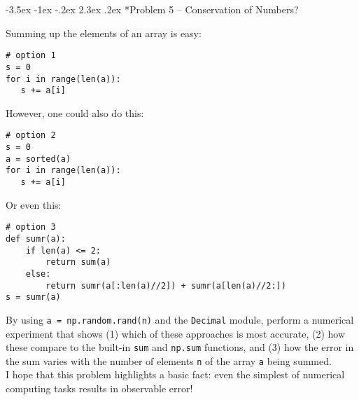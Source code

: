 \documentclass[11pt]{article}
\makeatletter
\renewcommand\section{\@startsection{section}{1}{\z@}%
                                  {-3.5ex \@plus -1ex \@minus -.2ex}%
                                  {2.3ex \@plus.2ex}%
                                  {\normalfont\bfseries}}
\makeatother
\begin{document}
\section*{Problem 5 -- Conservation of Numbers?}

Summing up the elements of an array is easy:
\begin{lstlisting}
# option 1
s = 0   
for i in range(len(a)):
   s += a[i]
\end{lstlisting}
However, one could also do this:
\begin{lstlisting}
# option 2
s = 0   
a = sorted(a)
for i in range(len(a)):
   s += a[i]
\end{lstlisting}
Or even this:
\begin{lstlisting}
# option 3
def sumr(a):
    if len(a) <= 2:
        return sum(a)
    else:
        return sumr(a[:len(a)//2]) + sumr(a[len(a)//2:])
s = sumr(a)
\end{lstlisting}
By using {\tt a = np.random.rand(n)} and the {\tt Decimal} module, perform a numerical experiment that shows (1) which of these approaches is most accurate, (2) how these compare to the built-in {\tt sum} and {\tt np.sum} functions, and (3) how the error in the sum varies with the number of elements {\tt n} of the array {\tt a} being summed. \\

I hope that this problem highlights a basic fact: even the simplest of numerical computing tasks results in observable error!
\end{document}
